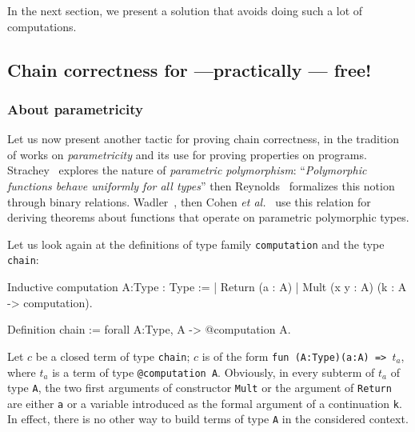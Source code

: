 In the next section, we present a solution that avoids doing such a lot of computations.

\subsection{Chain correctness for ---practically --- free!}
\label{correctness-for-free}





\subsubsection{About parametricity}
Let us now present another tactic for proving chain correctness,
in the tradition of works on \emph{parametricity} and its use for 
proving properties on programs.
Strachey~\cite{Strachey:2000:FCP:609150.609208}
explores the nature of \emph{parametric
polymorphism}: ``\emph{Polymorphic functions behave uniformly for all types}''
then Reynolds~\cite{REYNOLDS83} formalizes this notion through binary relations.
Wadler~\cite{Wadler1989}, then Cohen \emph{et al.}~\cite{Cohen2013}
use this relation for deriving
 theorems about functions that operate on parametric
polymorphic types.

Let us look again at the definitions of type family \texttt{computation}
and the type \texttt{chain}:

\begin{Coqsrc}
Inductive computation {A:Type}  : Type :=
| Return (a : A)
| Mult (x y : A) (k : A -> computation).

Definition chain := forall A:Type, A -> @computation A.
\end{Coqsrc}

Let $c$ be a closed term of type 
\texttt{chain}; $c$ is  of the form \linebreak
\texttt{fun (A:Type)(a:A) => $t_a$}, where $t_a$ is a term of type
\texttt{@computation A}.
\label{obvious-remark}
Obviously,  in every subterm of {$t_a$} of type \texttt{A}, 
the two first arguments of constructor \texttt{Mult} or the
argument of \texttt{Return} are either \texttt{a} or a variable 
introduced as the formal argument of a continuation \texttt{k}.
In effect, there is no other way to build terms of type \texttt{A} in the considered context.

